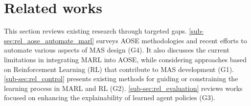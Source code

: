 \documentclass[pdflatex,sn-mathphys-num]{sn-jnl}%
\theoremstyle{thmstyleone}%
\theoremstyle{thmstyletwo}%
\theoremstyle{thmstylethree}%
\begin{document}
\section{Related works}\label{sec:related_works}

This section reviews existing research through targeted gaps. \autoref{sub-sec:rel_aose_automate_marl} surveys AOSE methodologies and recent efforts to automate various aspects of MAS design (G4). It also discusses the current limitations in integrating MARL into AOSE, while considering approaches based on Reinforcement Learning (RL) that contribute to MAS development (G1).
\autoref{sub-sec:rel_control} presents existing methods for guiding or constraining the learning process in MARL and RL (G2).
\autoref{sub-sec:rel_evaluation} reviews works focused on enhancing the explainability of learned agent policies (G3).
%
\end{document}
